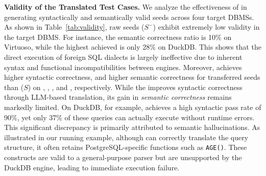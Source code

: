 \documentclass[sigconf,review,anonymous]{acmart}
\begin{document}
\textbf{Validity of the Translated Test Cases.}
We analyze the effectiveness of \tool{} in generating syntactically and semantically valid seeds across four target DBMSs. 
As shown in Table~\ref{tab:validity}, raw seeds ($S^-$) exhibit extremely low validity in the target DBMS. 
For instance, the semantic correctness ratio is 10\% on Virtuoso, while the highest achieved is only 28\% on DuckDB. 
This shows that the direct execution of foreign SQL dialects is largely ineffective due to inherent syntax and functional incompatibilities between engines.
Moreover, \tool{} achieves \synatxratio{} higher syntactic correctness, and \translateratio{} higher semantic correctness for transferred seeds than \sedar{} ($S$) on \duckdb{}, \clickhouse{}, \monetdb{}, and \virtuoso{}, respectively.
While the \sedar{} improves syntactic correctness through LLM-based translation, its gain in \textit{semantic correctness} remains markedly limited. On DuckDB, for example, \sedar{} achieves a high syntactic pass rate of 90\%, yet only 37\% of these queries can actually execute without runtime errors. This significant discrepancy is primarily attributed to semantic hallucinations. As illustrated in our running example, although \sedar{} can correctly translate the query structure, it often retains PostgreSQL-specific functions such as \texttt{AGE()}. These constructs are valid to a general-purpose parser but are unsupported by the DuckDB engine, leading to immediate execution failure.
\end{document}
